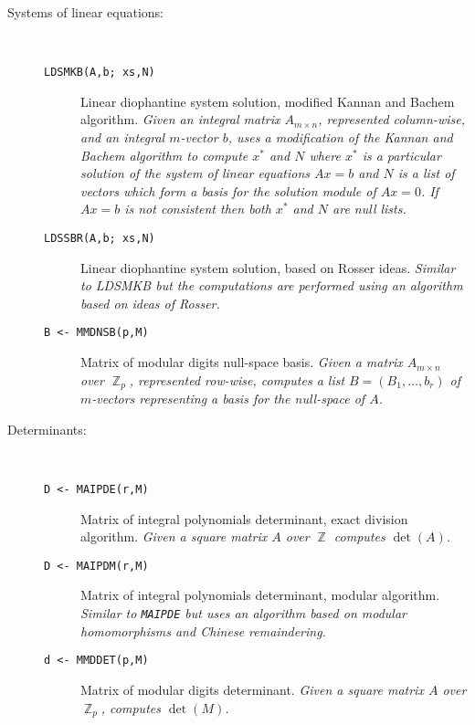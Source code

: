 \begin{description}

\item[Systems of linear equations:] \ \

\begin{description}

\item[{\tt  LDSMKB(A,b; xs,N) 
}] Linear diophantine system solution, modified Kannan and
Bachem algorithm. {\em Given an integral matrix $A_{m \times n}$,
represented column-wise, and an integral $m$-vector $b$, uses a 
modification of the Kannan and Bachem algorithm to
compute $x^*$ and $N$ where $x^*$ is a particular solution of the
system of linear equations $Ax = b$ and $N$ is a list of vectors which
form a basis for the solution module of $Ax = 0$.  If $Ax = b$ is not
consistent then both $x^*$ and $N$ are null lists.}

\item[{\tt  LDSSBR(A,b; xs,N) 
}] Linear diophantine system solution, based on Rosser
ideas. {\em Similar to {\rm LDSMKB} but the computations are performed
using an algorithm based on ideas of Rosser.}

\item[{\tt B <- MMDNSB(p,M) 
}] Matrix of modular digits null-space basis. {\em Given a
matrix $A_{m \times n}$ over $\BbbZ _p$, represented row-wise,
computes a list $B = (B_1,\ldots,b_r)$ of $m$-vectors representing a
basis for the null-space of $A$.}

\end{description} %


\item[Determinants:] \ \

\begin{description}

\item[{\tt D <- MAIPDE(r,M) 
}] Matrix of integral polynomials determinant, exact
division algorithm. {\em Given a square matrix $A$ over $\BbbZ$
computes $\det(A)$.}

\item[{\tt D <- MAIPDM(r,M) 
}] Matrix of integral polynomials determinant, modular
algorithm. {\em Similar to {\tt MAIPDE} but uses an algorithm based on
modular homomorphisms and Chinese remaindering.}

\item[{\tt d <- MMDDET(p,M) 
}] Matrix of modular digits determinant. {\em Given a
square matrix $A$ over $\BbbZ _p$, computes $\det(M)$.}


\end{description}
\end{description}
